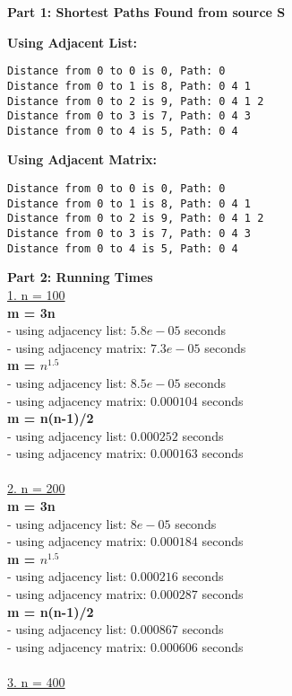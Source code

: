 \documentclass[letterpaper,12pt]{article}
\begin{document}
\begin{enumerate}
\textbf{Part 1: Shortest Paths Found from source S}

\textbf{Using Adjacent List:} 
\begin{verbatim}
Distance from 0 to 0 is 0, Path: 0 
Distance from 0 to 1 is 8, Path: 0 4 1 
Distance from 0 to 2 is 9, Path: 0 4 1 2 
Distance from 0 to 3 is 7, Path: 0 4 3 
Distance from 0 to 4 is 5, Path: 0 4
\end{verbatim}

\textbf{Using Adjacent Matrix:} 
\begin{verbatim}
Distance from 0 to 0 is 0, Path: 0 
Distance from 0 to 1 is 8, Path: 0 4 1 
Distance from 0 to 2 is 9, Path: 0 4 1 2 
Distance from 0 to 3 is 7, Path: 0 4 3 
Distance from 0 to 4 is 5, Path: 0 4 
\end{verbatim}

\textbf{Part 2: Running Times} \\
\underline{1. n = 100} \\
\textbf{m = 3n} \\
- using adjacency list: $5.8e-05$ seconds \\
- using adjacency matrix: $7.3e-05$ seconds \\
\textbf{m = $n^{1.5}$} \\
- using adjacency list: $8.5e-05$ seconds \\
- using adjacency matrix: $0.000104$ seconds \\
\textbf{m = n(n-1)/2} \\
- using adjacency list: $0.000252$ seconds \\
- using adjacency matrix: $0.000163$ seconds \\
\\
\underline{2. n = 200} \\
\textbf{m = 3n} \\
- using adjacency list: $8e-05$ seconds \\
- using adjacency matrix: $0.000184$ seconds \\
\textbf{m = $n^{1.5}$} \\
- using adjacency list: $0.000216$ seconds \\
- using adjacency matrix: $0.000287$ seconds \\
\textbf{m = n(n-1)/2} \\
- using adjacency list: $0.000867$ seconds \\
- using adjacency matrix: $0.000606$ seconds \\
\\
\underline{3. n = 400} \\

\end{enumerate}
\end{document}
